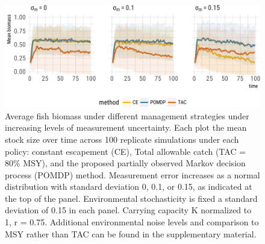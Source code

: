 \documentclass[3p]{elsarticle} %
\makeatletter
\def\maxwidth{\ifdim\Gin@nat@width>\linewidth\linewidth
\else\Gin@nat@width\fi}
\let\Oldincludegraphics\includegraphics
\renewcommand{\includegraphics}[1]{\Oldincludegraphics[width=\maxwidth]{#1}}
\makeatother
\begin{document}
\begin{figure}
\centering
\includegraphics{manuscript_files/figure-latex/sims-1.pdf}
\caption{Average fish biomass under different management strategies
under increasing levels of measurement uncertainty. Each plot the mean
stock size over time across 100 replicate simulations under each policy:
constant escapement (CE), Total allowable catch (TAC = 80\% MSY), and
the proposed partially observed Markov decision process (POMDP) method.
Measurement error increases as a normal distribution with standard
deviation 0, 0.1, or 0.15, as indicated at the top of the panel.
Environmental stochasticity is fixed a standard deviation of 0.15 in
each panel. Carrying capacity K normalized to 1, r = 0.75. Additional
environmental noise levels and comparison to MSY rather than TAC can be
found in the supplementary material. \label{sims}}
\end{figure}
\end{document}
